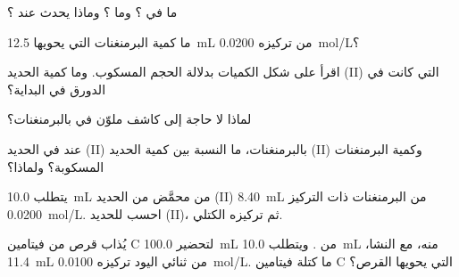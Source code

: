 \begin{exercise}[$\star$]\label{exo:g11:titration:1}
ما  في ؟ وما ؟ وماذا يحدث
عند ؟
\end{exercise}

\begin{exercise}[$\star$]\label{exo:g11:titration:2}
ما كمية  البرمنغنات التي يحويها \qty{12.5}{mL} من
 تركيزه \qty{0.0200}{mol/L}؟
\end{exercise}

\begin{exercise}[$\star$]\label{exo:g11:titration:3}
اقرأ  على شكل الكميات بدلالة الحجم المسكوب.
وما كمية الحديد (II) التي كانت في الدورق في
البداية؟
\end{exercise}

\begin{exercise}[$\star$]\label{exo:g11:titration:4}
لماذا لا حاجة إلى كاشف ملوّن في  بالبرمنغنات؟
\end{exercise}

\begin{exercise}[$\star$]\label{exo:g11:titration:5}
عند  في  الحديد (II) بالبرمنغنات، ما
النسبة بين كمية الحديد (II) وكمية البرمنغنات
المسكوبة؟ ولماذا؟
\end{exercise}

\begin{exercise}[$\star\star$]\label{exo:g11:titration:6}
يتطلب \qty{10.0}{mL} من  محمَّض من الحديد (II) \qty{8.40}{mL} من
البرمنغنات ذات التركيز \qty{0.0200}{mol/L}. احسب 
للحديد (II)، ثم تركيزه الكتلي.
\end{exercise}

\begin{exercise}[$\star\star$]\label{exo:g11:titration:7}
يُذاب قرص من فيتامين C لتحضير \qty{100.0}{mL} من .
ويتطلب \qty{10.0}{mL} منه، مع النشا، \qty{11.4}{mL} من ثنائي اليود تركيزه
\qty{0.0100}{mol/L}. ما كتلة فيتامين C التي يحويها القرص؟
\end{exercise}

